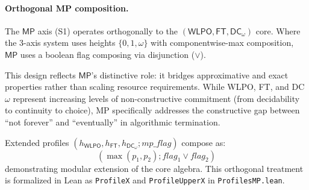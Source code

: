\documentclass[11pt]{article}
\newcommand{\WLPO}{\mathsf{WLPO}}
\newcommand{\FT}{\mathsf{FT}}
\newcommand{\DCw}{\mathsf{DC}_{\omega}}
\newcommand{\MP}{\mathsf{MP}}
\newcommand{\lean}[1]{\texttt{#1}}
\theoremstyle{plain}
\theoremstyle{definition}
\theoremstyle{remark}
\begin{document}
\paragraph{Orthogonal MP composition.}
The $\MP$ axis (S1) operates orthogonally to the $(\WLPO, \FT, \DCw)$ core. Where the 3-axis system uses heights $\{0,1,\omega\}$ with componentwise-max composition, $\MP$ uses a boolean flag composing via disjunction ($\lor$). 

This design reflects $\MP$'s distinctive role: it bridges approximative and exact properties rather than scaling resource requirements. While WLPO, FT, and DC$\omega$ represent increasing levels of non-constructive commitment (from decidability to continuity to choice), MP specifically addresses the constructive gap between ``not forever'' and ``eventually'' in algorithmic termination.

Extended profiles $(h_{\WLPO}, h_{\FT}, h_{\DCw}; \mathit{mp\_flag})$ compose as:
$$(\max(p_1, p_2); \mathit{flag}_1 \lor \mathit{flag}_2)$$
demonstrating modular extension of the core algebra. This orthogonal treatment is formalized in Lean as \lean{ProfileX} and \lean{ProfileUpperX} in \texttt{ProfilesMP.lean}.
\end{document}
